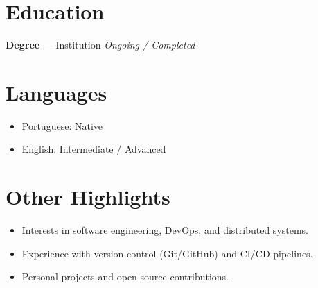 \documentclass[a4paper,10pt]{article}
\begin{document}
\section*{Education}
\textbf{Degree} — Institution \hfill \textit{Ongoing / Completed}

\section*{Languages}
\begin{itemize}[leftmargin=1.2em, noitemsep, topsep=3pt]
    \item Portuguese: Native
    \item English: Intermediate / Advanced
\end{itemize}

\section*{Other Highlights}
\begin{itemize}[leftmargin=1.2em, noitemsep, topsep=3pt]
    \item Interests in software engineering, DevOps, and distributed systems.
    \item Experience with version control (Git/GitHub) and CI/CD pipelines.
    \item Personal projects and open-source contributions.
\end{itemize}
\end{document}
